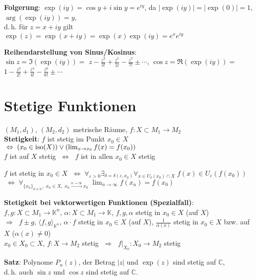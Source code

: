 \textbf{Folgerung}: $\exp(iy) = \cos y + i \sin y = e^{iy}$, da
$|\exp(iy)| = |\exp(0)| = 1$, $\arg(\exp(iy)) = y$, \\
d.\,h. für $z = x + iy$ gilt
$\exp(z) = \exp(x + iy) = \exp(x) \exp(iy) = e^x e^{iy}$

\textbf{Reihendarstellung von Sinus/Kosinus}: \\
$\sin z = \Im(\exp(iy)) =$ {\large $z - \frac{z^3}{3!} + \frac{z^5}{5!} -
\frac{z^7}{7!} \pm \cdots$}, \quad
$\cos z = \Re(\exp(iy)) =$ {\large $1 - \frac{z^2}{2!} + \frac{z^4}{4!} -
\frac{z^6}{6!} \pm \cdots$}

\section{%
    Stetige Funktionen%
}

$(M_1,d_1)$, $(M_2,d_2)$ metrische Räume, $f: X \subset M_1 \rightarrow M_2$ \\
\textbf{Stetigkeit}: $f$ ist stetig im Punkt $x_0 \in X$
$\;\Leftrightarrow\; (x_0 \in \operatorname{iso}(X)) \lor (\lim_{x \to x_0} f(x) = f(x_0))$
\\
$f$ ist auf $X$ stetig $\;\Leftrightarrow\;$
$f$ ist in allen $x_0 \in X$ stetig

\pagebreak

$f$ ist stetig in $x_0 \in X$
$\;\Leftrightarrow\; \forall_{\varepsilon > 0}
\exists_{\delta = \delta(\varepsilon, x_0)}
\forall_{x \in U_\delta(x_0) \cap X}\; f(x) \in U_\varepsilon(f(x_0))$ \\
$\;\Leftrightarrow\; \forall_{\{x_n\}_{n \in \mathbb{N}},\; x_n \in X,\;
x_n \xrightarrow{n \to \infty} x_0}\;
\lim_{n \to \infty} f(x_n) = f(x_0)$

\textbf{Stetigkeit bei vektorwertigen Funktionen (Spezialfall)}: \\
$f, g: X \subset M_1 \rightarrow \mathbb{K}^n$,
$\alpha: X \subset M_1 \rightarrow \mathbb{K}$, $f, g, \alpha$ stetig
in $x_0 \in X$ (auf $X$) \\
$\Rightarrow\;$
$f \pm g$, $\langle f, g \rangle_{\mathbb{K}^n}$, $\alpha \cdot f$ stetig
in $x_0 \in X$ (auf $X$),
$\frac{1}{\alpha(x)}$ stetig in $x_0 \in X$ bzw. auf $X$ ($\alpha(x) \not= 0$)
\\
$x_0 \in X_0 \subset X$, $f: X \rightarrow M_2$ stetig
$\;\Rightarrow\;$ $f|_{X_0}: X_0 \rightarrow M_2$ stetig

\textbf{Satz}: Polynome $P_n(z)$, der Betrag $|z|$ und $\exp(z)$ sind stetig
auf $\mathbb{C}$, \\
d.\,h. auch $\sin z$ und $\cos z$ sind stetig auf $\mathbb{C}$.

